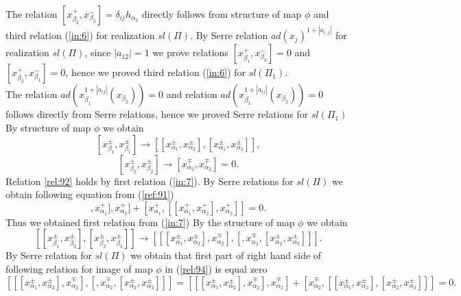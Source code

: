 \documentclass[english]{elsarticle}
\numberwithin{equation}{section}
\begin{document}
The relation $[x_{\beta_2}^+,x_{\beta_2}^-] = \delta_{ij}h_{\alpha_2}$ directly follows from structure of map $\phi$ and third relation (\ref{in:6}) for realization $sl(\Pi)$. By Serre relation $ad(x_{j})^{1+|a_{i,j}|}$ for realization $sl(\Pi)$, since $|a_{12}|=1$ we prove relations $[x_{\beta_1}^+,x_{\beta_2}^-]=0$ and $[x_{\beta_2}^+,x_{\beta_1}^-]=0$, hence we proved third relation (\ref{in:6}) for $sl(\Pi_1)$.\\
The relation $ad(x_{\beta_1}^{1+|a_{ij}|}(x_{\beta_2}))=0$ and relation $ad(x_{\beta_1}^{1+|a_{ij}|}(x_{\beta_2}))=0$ follows directly from Serre relations, hence we proved Serre relations for $sl(\Pi_1)$\\
By structure of map $\phi$ we obtain
\begin{equation}
\label{ref:91}
    [x_{\beta_1}^{\pm},x_{\beta_1}^{\pm}]\rightarrow [[x_{\alpha_1}^{\pm},x_{\alpha_2}^{\pm}],[x_{\alpha_1}^{\pm},x_{\alpha_2}^{\pm}]],
\end{equation}
\begin{equation}
\label{rel:92}
    [x_{\beta_2}^{\pm},x_{\beta_2}^{\pm}]\rightarrow [x_{\alpha_2}^{\mp},x_{\alpha_2}^{\mp}]=0.
\end{equation}
Relation \ref{rel:92} holds by first relation (\ref{in:7}).
By Serre relations for $sl(\Pi)$ we obtain following equation from (\ref{ref:91})
\begin{equation}
[[[x_{\alpha_1}^+,x_{\alpha_2}^+],x_{\alpha_1}^+],x_{\alpha_2}^+] + [x_{\alpha_1}^+,[[x_{\alpha_1}^+,x_{\alpha_2}^+],x_{\alpha_2}^+]] = 0.
\end{equation}
Thus we obtained first relation from (\ref{in:7})
By the structure of map $\phi$ we obtain
\begin{equation}
\label{rel:94}
[[x_{\beta_1}^{\pm},x_{\beta_2}^{\pm}],[x_{\beta_2}^{\pm},x_{\beta_3}^{\pm}]]\rightarrow [[[x_{\alpha_1}^{\pm},x_{\alpha_2}^{\pm}],x_{\alpha_2}^{\mp}],[,x_{\alpha_2}^{\mp},[x_{\alpha_2}^{\pm},x_{\alpha_3}^{\pm}]]].
\end{equation}
By Serre relation for $sl(\Pi)$ we obtain that first part of right hand side of following relation for image of map $\phi$ in (\ref{rel:94}) is equal zero
\begin{equation}
\label{rel:95}
[[[x_{\alpha_1}^{\pm},x_{\alpha_2}^{\pm}],x_{\alpha_2}^{\mp}],[,x_{\alpha_2}^{\mp},[x_{\alpha_2}^{\pm},x_{\alpha_3}^{\pm}]]]= [[[x_{\alpha_1}^{\pm},x_{\alpha_2}^{\pm}],x_{\alpha_2}^{\mp}],x_{\alpha_2}^{\mp}]+ [x_{\alpha_2}^{\mp},[[x_{\alpha_1}^{\pm},x_{\alpha_2}^{\pm}],[x_{\alpha_2}^{\pm},x_{\alpha_3}^{\pm}]]] = 0.
\end{equation}
\end{document}
